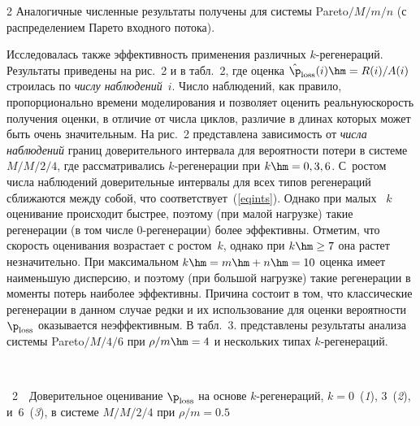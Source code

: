 \begin{multicols}{2}
Аналогичные численные результаты получены  для системы Pareto$/M/m/n$ (с
распределением Парето входного потока).



Исследовалась также эффективность применения различных $k$-ре\-ге\-не\-ра\-ций.
Результаты приведены на  рис.~2 и в табл.~2, где оценка $\hat{\p}_{\mathrm{loss}}(i)\hm=R(i)/A(i)$ 
строилась по {\it числу наблюдений}~$i$. Число
наблюдений, как правило, пропорционально времени моделирования и позволяет
оценить реальную\linebreak скорость получения оценки, в отличие от чис\-ла цик\-лов,
 различие в длинах которых может быть очень
значительным. На рис.~2 представлена зависимость от \textit{числа наблюдений }
границ доверительного интервала  для  вероятности потери в системе $M/M/2/4$,
где  рассматривались $k$-ре\-ге\-не\-ра\-ции при  $k\hm=0,3, 6$. 
С~ростом числа   наблюдений доверительные
интервалы для всех  типов регенераций сближаются между собой, что
соответствует~(\ref{eqints}). Однако при малых~ $k$ оценивание
происходит быстрее, поэтому (при малой нагрузке)  такие регенерации
(в том чис\-ле 0-ре\-ге\-не\-ра\-ции) более эффективны. 
Отметим, что скорость оценивания возрастает с ростом~$k$, однако при $k\hm\ge 7$ она растет
незначительно. При максимальном $k\hm=m\hm+n\hm=10$ оценка имеет наименьшую
дисперсию, и поэтому (при большой нагрузке) такие регенерации в
моменты потерь наиболее эффективны.  Причина состоит в том, что
классические регенерации в данном случае редки  и их использование  для оценки
вероятности $\p_{\mathrm{loss}}$ оказывается неэффективным.
В табл.~3.  пред\-став\-ле\-ны результаты
анализа системы Pareto$/M/4/6$ при $\rho/m\hm=4$ и нескольких типах
$k$-ре\-ге\-не\-раций.  %

\pagebreak

\noindent
\vspace*{-9pt}  %
 \begin{center}
 \mbox{%
 \epsfxsize=78.578mm
 }
 \end{center}
{{\figurename~2}\ \ \small{Доверительное оценивание  $\p_{\mathrm{loss}}$ на основе\protect\linebreak
$k$-ре\-ге\-нераций, $k=0$~(\textit{1}), 3~(\textit{2}), и~6~(\textit{3}),  
в сис\-те\-ме $M/M/2/4$ при $\rho/m=0.5$}}




\end{multicols}
